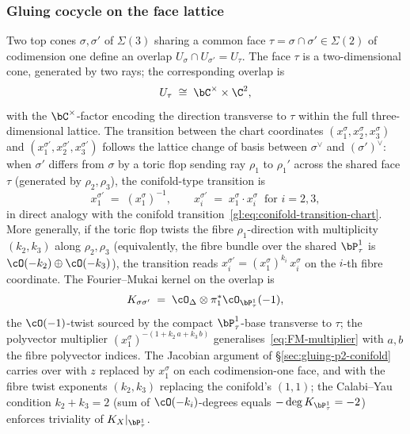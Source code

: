 \subsubsection{Gluing cocycle on the face lattice}

Two top cones $\sigma, \sigma'$ of $\Sigma(3)$ sharing a common face
$\tau = \sigma \cap \sigma' \in \Sigma(2)$ of codimension one define an
overlap $U_\sigma \cap U_{\sigma'} = U_\tau$. The face $\tau$ is a
two-dimensional cone, generated by two rays; the corresponding overlap is
\[
 U_\tau \;\cong\; \bC^\times \times \C^2,
\]
with the $\bC^\times$-factor encoding the direction transverse to $\tau$
within the full three-dimensional lattice. The transition between the chart coordinates
$(x_1^\sigma, x_2^\sigma, x_3^\sigma)$ and $(x_1^{\sigma'}, x_2^{\sigma'},
x_3^{\sigma'})$ follows the lattice change of basis between $\sigma^\vee$
and $(\sigma')^\vee$: when $\sigma'$ differs from $\sigma$ by a toric flop
sending ray $\rho_1$ to $\rho_1'$ across the shared face $\tau$ (generated
by $\rho_2, \rho_3$), the conifold-type transition is
\begin{equation}\label{eq:multi-chart-transition}
 x_1^{\sigma'} \;=\; (x_1^\sigma)^{-1},
 \qquad
 x_i^{\sigma'} \;=\; x_1^\sigma \cdot x_i^\sigma
 \;\; \text{for } i = 2, 3,
\end{equation}
in direct analogy with the conifold
transition~\eqref{gl:eq:conifold-transition-chart}. More generally, if the
toric flop twists the fibre $\rho_1$-direction with multiplicity $(k_2, k_3)$
along $\rho_2, \rho_3$ (equivalently, the fibre bundle over the shared
$\bP^1_\tau$ is $\cO(-k_2) \oplus \cO(-k_3)$), the transition reads
$x_i^{\sigma'} = (x_1^\sigma)^{k_i}\, x_i^\sigma$ on the $i$-th fibre
coordinate. The Fourier--Mukai kernel on the overlap is
\[
 K_{\sigma \sigma'} \;=\; \cO_\Delta \otimes \pi_1^* \cO_{\bP^1_{\tau}}(-1),
\]
the $\cO(-1)$-twist sourced by the compact $\bP^1_\tau$-base transverse
to $\tau$; the polyvector multiplier
$(x_1^\sigma)^{-(1 + k_2\, a + k_3\, b)}$ generalises~\eqref{eq:FM-multiplier}
with $a, b$ the fibre polyvector indices. The Jacobian
argument of \S\ref{sec:gluing-p2-conifold} carries over with $z$ replaced
by $x_1^\sigma$ on each codimension-one face, and with the fibre twist
exponents $(k_2, k_3)$ replacing the conifold's $(1, 1)$; the
Calabi--Yau condition $k_2 + k_3 = 2$ (sum of $\cO(-k_i)$-degrees equals
$-\deg K_{\bP^1_\tau} = -2$) enforces triviality of
$K_{X}|_{\bP^1_\tau}$.


